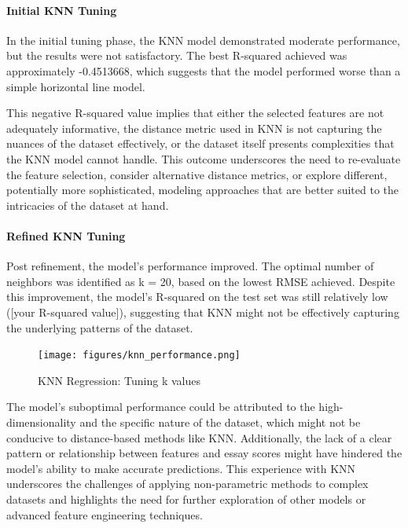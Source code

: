 \documentclass[8pt]{article}
\begin{document}
\paragraph{Initial KNN Tuning}
In the initial tuning phase, the KNN model demonstrated moderate performance, but the results were not satisfactory. The best R-squared achieved was approximately -0.4513668, which suggests that the model performed worse than a simple horizontal line model.

This negative R-squared value implies that either the selected features are not adequately informative, the distance metric used in KNN is not capturing the nuances of the dataset effectively, or the dataset itself presents complexities that the KNN model cannot handle. This outcome underscores the need to re-evaluate the feature selection, consider alternative distance metrics, or explore different, potentially more sophisticated, modeling approaches that are better suited to the intricacies of the dataset at hand.

\paragraph{Refined KNN Tuning}
Post refinement, the model's performance improved. The optimal number of neighbors was identified as k = 20, based on the lowest RMSE achieved. Despite this improvement, the model's R-squared on the test set was still relatively low ([your R-squared value]), suggesting that KNN might not be effectively capturing the underlying patterns of the dataset.

\begin{figure}[H]
    \centering
    \texttt{[image: figures/knn\_performance.png]}
    \caption{KNN Regression: Tuning k values}
    \label{fig:knn_performance}
\end{figure}

The model's suboptimal performance could be attributed to the high-dimensionality and the specific nature of the dataset, which might not be conducive to distance-based methods like KNN. Additionally, the lack of a clear pattern or relationship between features and essay scores might have hindered the model's ability to make accurate predictions. This experience with KNN underscores the challenges of applying non-parametric methods to complex datasets and highlights the need for further exploration of other models or advanced feature engineering techniques.
\end{document}
